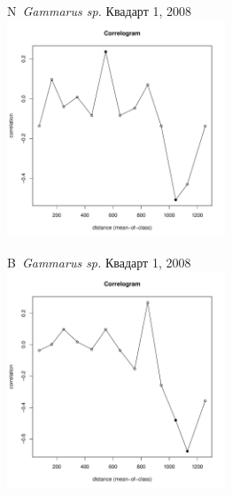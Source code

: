 \begin{figure}[h]
	\begin{minipage}[b]{.46\linewidth}
	\begin{center}
	{\small N~{\it Gammarus sp.} Квадарт 1, 2008}
		\includegraphics[width=65mm]{../Barenc_Sea/distribution_Moran/Plyazh081_moran_N_Gammarus_sp_.pdf}
	\end{center}
	\end{minipage}
%
	\hfil %
%
	\begin{minipage}[b]{.46\linewidth}
	\begin{center}
	{\small B~{\it Gammarus sp.} Квадарт 1, 2008}
		\includegraphics[width=65mm]{../Barenc_Sea/distribution_Moran/Plyazh081_moran_B_Gammarus_sp_.pdf}
	\end{center}
	\end{minipage}



\end{figure}
